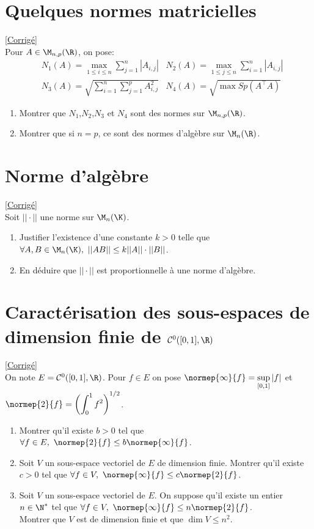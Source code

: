 \documentclass{book}
\begin{document}
	\section{Quelques normes matricielles}
	\textcolor{blue}{\hyperref[sec:quelques-normes-matricielles]{[Corrigé]}}\\
	\label{Quelques normes matricielles}
	Pour $A\in\M_{n,p}(\R)$, on pose: \begin{align*}
		&N_1(A)=\max_{1\leq i\leq n}\sum_{j=1}^n|A_{i,j}|  &N_2(A)=\max_{1\leq j\leq n}\sum_{i=1}^n|A_{i,j}|\\
		&N_3(A)=\sqrt{\sum_{i=1}^n\sum_{j=1}^pA_{i,j}^2}  &N_4(A)=\sqrt{\max Sp(A^\top A)}
	\end{align*}
	\begin{enumerate}
		\item Montrer que $N_1$,$N_2$,$N_3$ et $N_4$ sont des normes sur $\M_{n,p}(\R)$.
		\item Montrer que si $n=p$, ce sont des normes d'algèbre sur $\M_n(\R)$.
	\end{enumerate}
	
	\section{Norme d'algèbre }
	\textcolor{blue}{\hyperref[Norme d'algèbre corrigé]{[Corrigé]}}\\
	\label{Norme d'algèbre}
	Soit $||\cdot||$ une norme sur $\M_n(\K)$.
	\begin{enumerate}
		\item Justifier l'existence d'une constante $k>0$ telle que $\forall A,B\in \M_n(\K),\ ||AB||\leq k||A||\cdot||B||$.
		\item En déduire que $||\cdot||$ est proportionnelle à une norme d'algèbre.
	\end{enumerate}
	
	\section{Caractérisation des sous-espaces de dimension finie de $\mathcal C^0([0,1],\R)$ }
	\textcolor{blue}{\hyperref[Caractérisation des sous-espaces de dimension finie de C0 corrigé]{[Corrigé]}}\\
	\label{Caractérisation des sous-espaces de dimension finie de C0}
	On note $E=\mathcal C^0([0,1],\R)$. Pour $f\in E$ on pose $\normep{\infty}{f}=\sup\limits_{[0,1]}|f|$ et $\normep{2}{f}=\displaystyle\left(\int_0^1f^2\right)^{1/2}$.
	\begin{enumerate}
		\item Montrer qu'il existe $b>0$ tel que $\forall f\in E,\ \normep{2}{f}\leq b\normep{\infty}{f}$.
		\item Soit $V$ un sous-espace vectoriel de $E$ de dimension finie. Montrer qu'il existe $c>0$ tel que $\forall f\in V,\ \normep{\infty}{f}\leq c\normep{2}{f}$.
		\item Soit $V$ un sous-espace vectoriel de $E$. On suppose qu'il existe un entier $n\in \N^*$ tel que $\forall f\in V,\ \normep{\infty}{f}\leq n\normep{2}{f}$.\\
		Montrer que $V$ est de dimension finie et que $\dim V\leq n^2$.
	\end{enumerate}
	
\end{document}
